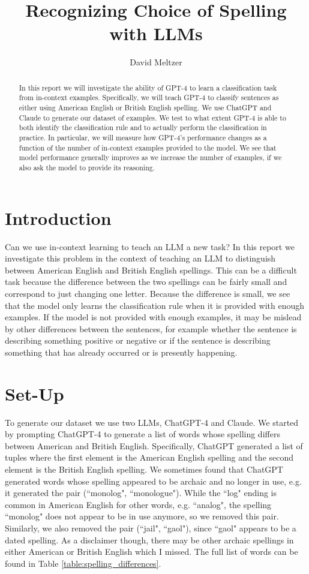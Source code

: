 \documentclass{article}
\title{Recognizing Choice of Spelling with LLMs}
\author{David Meltzer}
\begin{document}
\maketitle

\begin{abstract}
In this report we will investigate the ability of GPT-4 to learn a classification task from in-context examples.
Specifically, we will teach GPT-4 to classify sentences as either using American English or British English spelling.
We use ChatGPT and Claude to generate our dataset of examples.
We test to what extent GPT-4 is able to both identify the classification rule and to actually perform the classification in practice.
In particular, we will measure how GPT-4's performance changes as a function of the number of in-context examples provided to the model. 
We see that model performance generally improves as we increase the number of examples, if we also ask the model to provide its reasoning.

\end{abstract}

\section{Introduction}
Can we use in-context learning to teach an LLM a new task?
In this report we investigate this problem in the context of teaching an LLM to distinguish between American English and British English spellings.
This can be a difficult task because the difference between the two spellings can be fairly small and correspond to just changing one letter.
Because the difference is small, we see that the model only learns the classification rule when it is provided with enough examples.
If the model is not provided with enough examples, it may be mislead by other differences between the sentences, for example whether the sentence is describing something positive or negative or if the sentence is describing something that has already occurred or is presently happening.

\section{Set-Up}
\label{sec:setup}
To generate our dataset we use two LLMs, ChatGPT-4 and Claude. 
We started by prompting ChatGPT-4 to generate a list of words whose spelling differs between American and British English.
Specifically, ChatGPT generated a list of tuples where the first element is the American English spelling and the second element is the British English spelling.
We sometimes found that ChatGPT generated words whose spelling appeared to be archaic and no longer in use, e.g. it generated the pair (``monolog", ``monologue").
While the ``log" ending is common in American English for other words, e.g. ``analog", the spelling ``monolog" does not appear to be in use anymore, so we removed this pair. 
Similarly, we also removed the pair (``jail", ``gaol"), since ``gaol" appears to be a dated spelling.
As a disclaimer though, there may be other archaic spellings in either American or British English which I missed.
The full list of words can be found in Table \ref{table:spelling_differences}.
\end{document}
